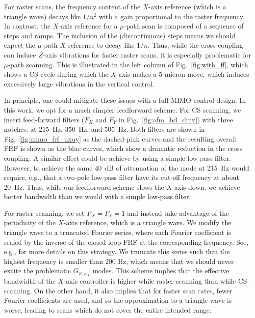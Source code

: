 \documentclass[journal]{IEEEtran}
\begin{document}
For raster scans, the frequency content of the $X$-axis reference
(which is a triangle wave) decays like $1/n^2$ with a gain
proportional to the raster frequency. In contrast, the $X$-axis
reference for a $\mu$-path scan is composed of a sequence of steps and
ramps. The inclusion of the (discontinuous) steps means we should
expect the $\mu$-path $X$ reference to decay like $1/n$. Thus, while
the cross-coupling can induce $Z$-axis vibrations for faster raster
scans, it is especially problematic for $\mu$-path scanning. This is
illustrated in the left column of Fig.~\ref{fig:with_ff}, which shows
a CS cycle during which the $X$-axis makes a 5 micron move, which
induces excessively large vibrations in the vertical control.

In principle, one could mitigate these issues with a full MIMO control
design. In this work, we opt for a much simpler feedforward scheme.
For CS scanning, we insert feed-forward filters ($F_X$ and $F_Y$ in
Fig.~\ref{fig:afm_bd_dinv}) with three notches: at 215~Hz, 350~Hz, and
505~Hz. Both filters are shown in Fig.~\ref{fig:mimo_frf_uxuy} as the
dashed-pink curves and the
resulting overall FRF is shown as the
blue curves, which show a
dramatic reduction in the cross coupling. A similar effect could be
achieve by using a simple low-pass filter. However, to achieve the
same 40~dB of attenuation of the mode at 215~Hz would require, e.g.,
that a two-pole low-pass filter have its cut-off frequency at about
20~Hz. Thus, while our feedforward scheme slows the $X$-axis down, we
achieve better bandwidth than we would with a simple low-pass filter.

For raster scanning, we set $F_X=F_Y=1$ and instead take advantage of
the periodicity of the $X$-axis reference, which is a triangle wave.
We modify the triangle wave to a truncated Fourier series, where each
Fourier coefficient is scaled by the inverse of the closed-loop FRF at
the corresponding frequency. See, e.g., \cite{clayton_review_2009} for
more details on this strategy. We truncate this series such that the
highest frequency is smaller than 200 Hz, which means that we should
never excite the problematic $G_{Z,u_X}$ modes. This scheme implies
that the effective bandwidth of the $X$-axis controller is higher
while raster scanning than while CS-scanning. On the other hand, it
also implies that for faster scan rates, fewer Fourier
coefficients are used, and so the approximation to a triangle wave is
worse, leading to scans which do not cover the entire intended range.
\end{document}
